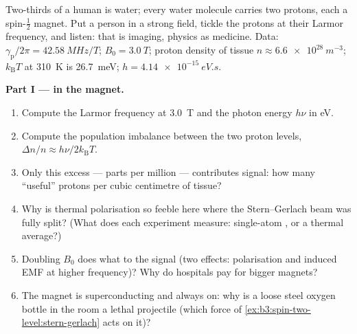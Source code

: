 \begin{problem}\label{pb:b3:spin-two-level:1}
Two-thirds of a human is water; every water molecule carries two
protons, each a spin-$\tfrac12$ magnet. Put a person in a strong
field, tickle the protons at their Larmor frequency, and listen:
that is  imaging,  physics as medicine. Data:
$\gamma_{\text{p}}/2\pi = \qty{42.58}{MHz/T}$; $B_0 = \qty{3.0}{T}$;
proton density of tissue $n \approx \qty{6.6e28}{m^{-3}}$;
$k_{\text{B}}T$ at \qty{310}{K} is \qty{26.7}{meV}; $h =
\qty{4.14e-15}{eV.s}$.

\medskip\noindent\textbf{Part I ---  in the magnet.}
\begin{enumerate}
  \item Compute the Larmor frequency at \qty{3.0}{T} and the photon
        energy $h\nu$ in eV.
  \item Compute the population imbalance between the two proton
        levels, $\Delta n/n \approx h\nu/2k_{\text{B}}T$.
  \item Only this excess --- parts per million --- contributes
        signal: how many ``useful'' protons per cubic centimetre of
        tissue?
  \item Why is thermal polarisation so feeble here where the
        Stern--Gerlach beam was fully split? (What does each
        experiment measure: single-atom , or a thermal
        average?)
  \item Doubling $B_0$ does what to the signal (two effects:
        polarisation and induced EMF at higher frequency)? Why do
        hospitals pay for bigger magnets?
  \item The magnet is superconducting and always on: why is a
        loose steel oxygen bottle in the room a lethal projectile
        (which force of \cref{ex:b3:spin-two-level:stern-gerlach}
        acts on it)?
\end{enumerate}


\end{problem}
